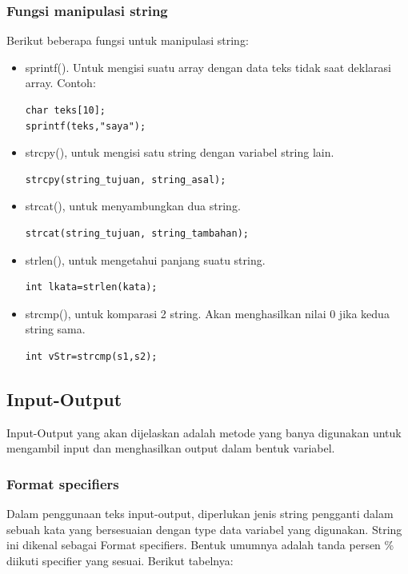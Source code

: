 \documentclass[12pt,]{article}
\begin{document}
	\subsubsection{Fungsi manipulasi string}
	Berikut beberapa fungsi untuk manipulasi string:
	\begin{itemize}
		\item sprintf(). Untuk mengisi suatu array dengan data teks tidak saat deklarasi array.
		Contoh:
		\begin{verbatim}
char teks[10];
sprintf(teks,"saya");
		\end{verbatim}

		\item strcpy(), untuk mengisi satu string dengan variabel string lain.
		\begin{verbatim}
strcpy(string_tujuan, string_asal);
		\end{verbatim}

		\item strcat(), untuk menyambungkan dua string.
		\begin{verbatim}
strcat(string_tujuan, string_tambahan);
		\end{verbatim}

		\item strlen(), untuk mengetahui panjang suatu string.
		\begin{verbatim}
int lkata=strlen(kata);
		\end{verbatim}

		\item strcmp(), untuk komparasi 2 string.
		Akan menghasilkan nilai 0 jika kedua string sama.
		\begin{verbatim}
int vStr=strcmp(s1,s2);
		\end{verbatim}
	\end{itemize}

	\newpage
	\subsection{Input-Output}
	Input-Output yang akan dijelaskan adalah metode yang banya digunakan untuk mengambil input dan menghasilkan output dalam bentuk variabel.

	\subsubsection{Format specifiers}
	Dalam penggunaan teks input-output, diperlukan jenis string pengganti dalam sebuah kata yang bersesuaian dengan type data variabel yang digunakan.
	String ini dikenal sebagai Format specifiers.
	Bentuk umumnya adalah tanda persen \% diikuti specifier yang sesuai.
	Berikut tabelnya:
\end{document}
